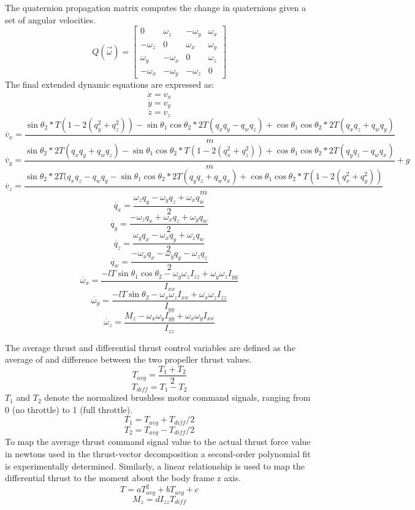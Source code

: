 \documentclass[]{article}
\begin{document}
The quaternion propagation matrix computes the change in quaternions given a set of angular velocities.
        \[
        Q(\vec{\omega}) =
        \begin{bmatrix}
        0 & \omega_z & -\omega_y & \omega_x \\
        -\omega_z & 0 & \omega_x & \omega_y \\
        \omega_y & -\omega_x & 0 & \omega_z \\
        -\omega_x & -\omega_y & -\omega_z & 0
        \end{bmatrix}
	\]
	The final extended dynamic equations are expressed as:
	\[
		\dot{x} = v_x
	\]
	\[
		\dot{y} = v_y
	\]
	\[
		\dot{z} = v_z
	\]
	\[
		\dot{v_x} = \frac{\sin{\theta_2} *T(1 - 2(q_y^2 + q_z^2))-\sin{\theta_1}\cos{\theta_2}*2T(q_x q_y - q_w q_z)+\cos{\theta_1}\cos{\theta_2}* 2T(q_x q_z + q_w q_y)}{m}
	\]
	\[
		\dot{v_y} =\frac{\sin{\theta_2} *2T(q_x q_y + q_w q_z)-\sin{\theta_1}\cos{\theta_2}*T(1 - 2(q_x^2 + q_z^2))+\cos{\theta_1}\cos{\theta_2}* 2T(q_y q_z - q_w q_x)}{m}+g
	\]
	\[
		\dot{v_z} = \frac{\sin{\theta_2} *2T(q_x q_z - q_w q_y-\sin{\theta_1}\cos{\theta_2}* 2T(q_y q_z + q_w q_x)+\cos{\theta_1}\cos{\theta_2}* T(1 - 2(q_x^2 + q_y^2))}{m}
	\]
	\[
		\dot{q_x} = \frac{\omega_z q_y-\omega_y q_z+ \omega_x q_w}{2}
	\]
	\[
		\dot{q_y} = \frac{-\omega_z q_x+\omega_x q_z+ \omega_y q_w}{2}
	\]
	\[
		\dot{q_z} =  \frac{\omega_y q_x-\omega_x q_y+ \omega_z q_w}{2}
	\]
	\[
		\dot{q_w} =  \frac{-\omega_x q_x - \omega_y q_y - \omega_z q_z}{2}
	\]
	\[
		\dot{\omega_x} = \frac{-lT\sin{\theta_1}\cos{\theta_2}-\omega_y\omega_zI_{zz} + \omega_y\omega_zI_{yy}}{I_{xx}}
	\]
	\[
		\dot{\omega_y} = \frac{-lT\sin{\theta_2}-\omega_x\omega_zI_{xx} + \omega_x\omega_zI_{zz}}{I_{yy}}
	\]
	\[
		\dot{\omega_z} =  \frac{M_z -\omega_x\omega_yI_{yy} + \omega_x\omega_yI_{xx}}{I_{zz}}
	\]

	The average thrust and differential thrust control variables are defined as the average of and difference between the two propeller thrust values. 
	\[
		T_{avg} =\frac{T_1+T_2}{2}
	\]
	\[
		T_{diff} =T_1-T_2
	\]
$T_1$ and $T_2$ denote the normalized brushless motor command signals, ranging from 0 (no throttle) to 1 (full throttle).
	\[
		T_1 = T_{avg} + T_{diff}/2
	\]
	\[
		T_2 = T_{avg} - T_{diff}/2
	\]
To map the average thrust command signal value to the actual thrust force value in newtons used in the thrust-vector decomposition a second-order polynomial fit is experimentally determined. Similarly, a linear relationship is used to map the differential thrust to the moment about the body frame z axis.
	\[
		T = aT_{avg}^2+bT_{avg}+c
	\]
	\[
		M_z = d I_{zz} T_{diff}
	\]
\end{document}
